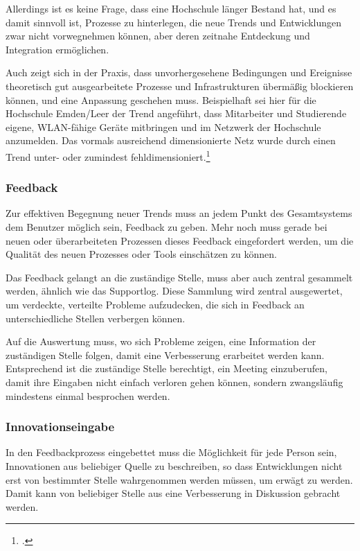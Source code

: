 Allerdings ist es keine Frage, dass eine Hochschule länger Bestand hat, und es damit 
sinnvoll ist, Prozesse zu hinterlegen, die neue Trends und Entwicklungen zwar nicht 
vorwegnehmen können, aber deren zeitnahe Entdeckung und Integration ermöglichen.

Auch zeigt sich in der Praxis, dass unvorhergesehene Bedingungen und Ereignisse 
theoretisch gut ausgearbeitete Prozesse und Infrastrukturen übermäßig blockieren können, 
und eine Anpassung geschehen muss. Beispielhaft sei hier für die Hochschule Emden/Leer 
der Trend angeführt, dass Mitarbeiter und Studierende eigene, WLAN-fähige Geräte 
mitbringen und im Netzwerk der Hochschule anzumelden. Das vormals ausreichend 
dimensionierte Netz wurde durch einen Trend unter- oder zumindest 
fehldimensioniert.\footcite{gunter_muller_interview}

\subsubsection{Feedback}
Zur effektiven Begegnung neuer Trends muss an jedem Punkt des Gesamtsystems dem 
Benutzer möglich sein, Feedback zu geben. Mehr noch muss gerade bei neuen oder 
überarbeiteten Prozessen dieses Feedback eingefordert werden, um die Qualität des neuen 
Prozesses oder Tools einschätzen zu können.

Das Feedback gelangt an die zuständige Stelle, muss aber auch zentral gesammelt werden, 
ähnlich wie das Supportlog. Diese Sammlung wird zentral ausgewertet, um verdeckte, 
verteilte Probleme aufzudecken, die sich in Feedback an unterschiedliche Stellen verbergen 
können.

Auf die Auswertung muss, wo sich Probleme zeigen, eine Information der zuständigen Stelle 
folgen, damit eine Verbesserung erarbeitet werden kann. Entsprechend ist die zuständige 
Stelle berechtigt, ein Meeting einzuberufen, damit ihre Eingaben nicht einfach verloren gehen 
können, sondern zwangsläufig mindestens einmal besprochen werden.

\subsubsection{Innovationseingabe}
In den Feedbackprozess eingebettet muss die Möglichkeit für jede Person sein, Innovationen 
aus beliebiger Quelle zu beschreiben, so dass Entwicklungen nicht erst von bestimmter 
Stelle wahrgenommen werden müssen, um erwägt zu werden. Damit kann von beliebiger 
Stelle aus eine Verbesserung in Diskussion gebracht werden.

